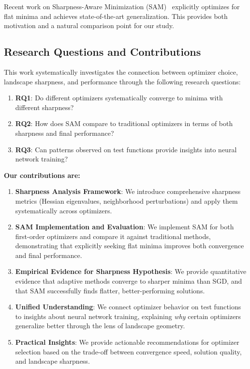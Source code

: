 \documentclass[12pt,a4paper]{article}
\begin{document}
Recent work on Sharpness-Aware Minimization (SAM)~\cite{foret2020sharpness} explicitly optimizes for flat minima and achieves state-of-the-art generalization. This provides both motivation and a natural comparison point for our study.

\subsection{Research Questions and Contributions}

This work systematically investigates the connection between optimizer choice, landscape sharpness, and performance through the following research questions:

\begin{enumerate}
    \item \textbf{RQ1}: Do different optimizers systematically converge to minima with different sharpness?
    \item \textbf{RQ2}: How does SAM compare to traditional optimizers in terms of both sharpness and final performance?
    \item \textbf{RQ3}: Can patterns observed on test functions provide insights into neural network training?
\end{enumerate}

\textbf{Our contributions are:}

\begin{enumerate}
    \item \textbf{Sharpness Analysis Framework}: We introduce comprehensive sharpness metrics (Hessian eigenvalues, neighborhood perturbations) and apply them systematically across optimizers.
    
    \item \textbf{SAM Implementation and Evaluation}: We implement SAM for both first-order optimizers and compare it against traditional methods, demonstrating that explicitly seeking flat minima improves both convergence and final performance.
    
    \item \textbf{Empirical Evidence for Sharpness Hypothesis}: We provide quantitative evidence that adaptive methods converge to sharper minima than SGD, and that SAM successfully finds flatter, better-performing solutions.
    
    \item \textbf{Unified Understanding}: We connect optimizer behavior on test functions to insights about neural network training, explaining \emph{why} certain optimizers generalize better through the lens of landscape geometry.
    
    \item \textbf{Practical Insights}: We provide actionable recommendations for optimizer selection based on the trade-off between convergence speed, solution quality, and landscape sharpness.
\end{enumerate}
\end{document}
